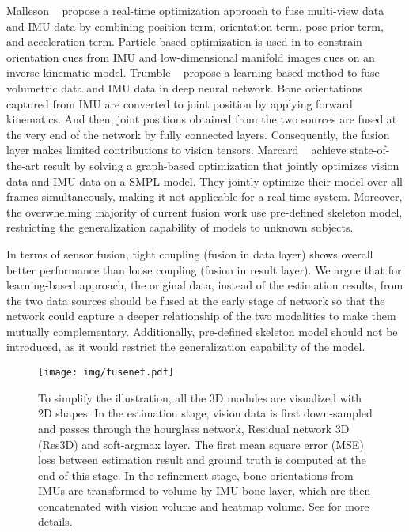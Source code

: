 \documentclass[10pt,twocolumn,letterpaper]{article}
\begin{document}
Malleson \etal~\cite{malleson2017real} propose a real-time optimization approach to fuse multi-view data and IMU data by combining position term, orientation term, pose prior term, and acceleration term. Particle-based optimization is used in \cite{Pons11} to constrain orientation cues from IMU and low-dimensional manifold images cues on an inverse kinematic model. Trumble \etal~\cite{trumble2017total} propose a learning-based method to fuse volumetric data and IMU data in deep neural network. Bone orientations captured from IMU are converted to joint position by applying forward kinematics. And then, joint positions obtained from the two sources are fused at the very end of the network by fully connected layers. Consequently, the fusion layer makes limited contributions to vision tensors. Marcard \etal~\cite{von2018recovering} achieve state-of-the-art result by solving a graph-based optimization that jointly optimizes vision data and IMU data on a SMPL model. They jointly optimize their model over all frames simultaneously, making it not applicable for a real-time system. Moreover, the overwhelming majority of current fusion work use pre-defined skeleton model, restricting the generalization capability of models to unknown subjects.

In terms of sensor fusion, tight coupling (fusion in data layer) shows overall better performance than loose coupling (fusion in result layer)\cite{8259006}. We argue that for learning-based approach, the original data, instead of the estimation results, from the two data sources should be fused at the early stage of network so that the network could capture a deeper relationship of the two modalities to make them mutually complementary. Additionally, pre-defined skeleton model should not be introduced, as it would restrict the generalization capability of the model. 








\begin{figure*}
\begin{center}
\texttt{[image: img/fusenet.pdf]}
\end{center}
  \vspace{-0.8cm}
  \caption{To simplify the illustration, all the 3D modules are visualized with 2D shapes. In the estimation stage, vision data is first down-sampled and passes through the hourglass network, Residual network 3D (Res3D) and soft-argmax layer. The first mean square error (MSE) loss between estimation result and ground truth is computed at the end of this stage. In the refinement stage, bone orientations from IMUs are transformed to  volume by IMU-bone layer, which are then concatenated with vision volume and heatmap volume. See  for more details.}
\label{fig:overall}
\vspace*{-0.2cm}
\end{figure*}
\end{document}
